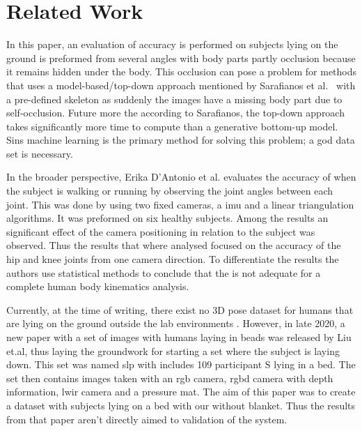\section{Related Work}
\label{sec:related_work}
In this paper, an evaluation of accuracy is performed on subjects lying on the ground is preformed from several angles with body parts partly occlusion because it remains hidden under the body.
This occlusion can pose a problem for methods that uses a model-based/top-down approach mentioned by Sarafianos et al.~\cite{sarafianos2016} with a pre-defined skeleton as suddenly the images have a missing body part due to self-occlusion.
Future more the according to Sarafianos, the top-down approach takes significantly more time to compute than a generative bottom-up model.
Sins machine learning is the primary method for solving this problem; a god data set is necessary.

In the broader perspective, Erika D’Antonio et al. \cite{d2021validation} evaluates the accuracy of \openposeS when the subject is walking or running by observing the joint angles between each joint.
This was done by using two fixed cameras, a \ac{imu} and a linear triangulation algorithms. It was preformed on six healthy subjects.
Among the results an significant effect of the camera positioning in relation to the subject was observed.
Thus the results that where analysed focused on the accuracy of the hip and knee joints from one camera direction.
To differentiate the results the authors use statistical methods to conclude that the \operpose{ } is not adequate for a complete human body kinematics analysis.

Currently, at the time of writing, there exist no 3D pose dataset for humans that are lying on the ground outside the lab environments \cite{yang2018, mehta2017, yasin2016, wang2019}.
However, in late 2020, a new paper with a set of images with humans laying in beads was released by Liu et.al\cite{liu2020simultaneously}, thus laying the groundwork for starting a set where the subject is laying down.
This set was named \ac{slp} with includes 109 participant S lying in a bed.
The set then contains images taken with an \ac{rgb} camera, \ac{rgbd} camera with depth information, \ac{lwir} camera and a pressure mat.
The aim of this paper was to create a dataset with subjects lying on a bed with our without blanket.
Thus the results from that paper aren't directly aimed to validation of the system.

